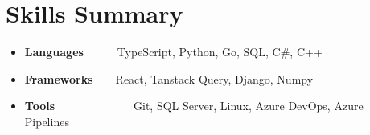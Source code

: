 \documentclass[a4paper,20pt]{article}
\newcommand{\resumeItem}[2]{
  \item\small{
    \textbf{#1}{#2 \vspace{-2pt}}
  }
}
\newcommand{\resumeSubItem}[2]{\resumeItem{#1}{#2}\vspace{-3pt}}
\newcommand{\resumeSubHeadingListStart}{\begin{itemize}[leftmargin=*]}
\newcommand{\resumeSubHeadingListEnd}{\end{itemize}}
\begin{document}
\vspace{-5pt}
\section{Skills Summary}
	\resumeSubHeadingListStart
	\resumeSubItem{Languages}{~~~~~~TypeScript, Python, Go, SQL, C\#, C++}
	\resumeSubItem{Frameworks}{~~~~React, Tanstack Query, Django, Numpy}
	\resumeSubItem{Tools}{~~~~~~~~~~~~~~Git, SQL Server, Linux, Azure DevOps, Azure Pipelines}

\resumeSubHeadingListEnd

\end{document}
